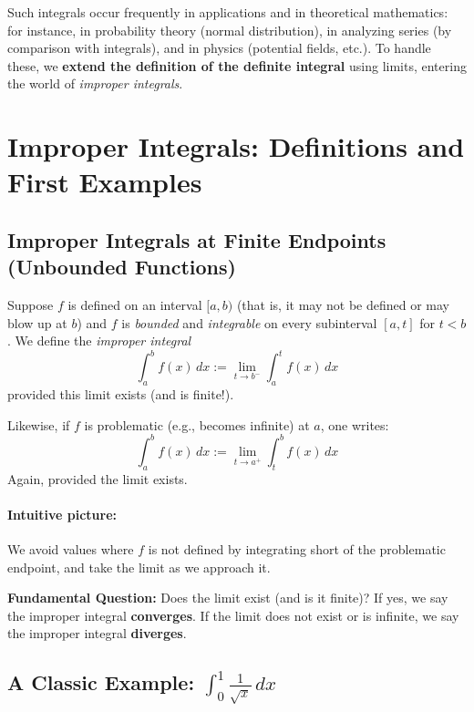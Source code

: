 \documentclass[11pt,oneside]{article}
\theoremstyle{definition}
\theoremstyle{remark}
\begin{document}
Such integrals occur frequently in applications and in theoretical mathematics: for instance, in probability theory (normal distribution), in analyzing series (by comparison with integrals), and in physics (potential fields, etc.). To handle these, we \textbf{extend the definition of the definite integral} using limits, entering the world of \emph{improper integrals}.

\section{Improper Integrals: Definitions and First Examples}

\subsection{Improper Integrals at Finite Endpoints (Unbounded Functions)}

Suppose $f$ is defined on an interval $[a, b)$ (that is, it may not be defined or may blow up at $b$) and $f$ is \emph{bounded} and \emph{integrable} on every subinterval $[a, t]$ for $t < b$.
We define the \emph{improper integral}
\[
\int_a^b f(x)\,dx := \lim_{t \to b^-} \int_a^t f(x)\,dx
\]
provided this limit exists (and is finite!).

Likewise, if $f$ is problematic (e.g., becomes infinite) at $a$, one writes:
\[
\int_a^b f(x)\,dx := \lim_{t \to a^+} \int_t^b f(x)\,dx
\]
Again, provided the limit exists.

\paragraph{Intuitive picture:}
We avoid values where $f$ is not defined by integrating short of the problematic endpoint, and take the limit as we approach it.

\vspace{0.7em}
\noindent
\textbf{Fundamental Question:} Does the limit exist (and is it finite)? If yes, we say the improper integral \textbf{converges}. If the limit does not exist or is infinite, we say the improper integral \textbf{diverges}.

\subsection{A Classic Example: $\displaystyle \int_0^1 \frac{1}{\sqrt{x}}\,dx$}
\end{document}
